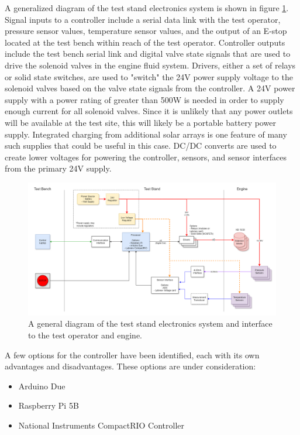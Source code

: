         A generalized diagram of the test stand electronics system is shown in figure \ref{fig:gen_elec}. Signal inputs to a controller include a serial data link with the test operator, pressure sensor values, temperature sensor values, and the output of an E-stop located at the test bench within reach of the test operator. Controller outputs include the test bench serial link and digital valve state signals that are used to drive the solenoid valves in the engine fluid system. Drivers, either a set of relays or solid state switches, are used to "switch" the 24V power supply voltage to the solenoid valves based on the valve state signals from the controller. A 24V power supply with a power rating of greater than 500W is needed in order to supply enough current for all solenoid valves. Since it is unlikely that any power outlets will be available at the test site, this will likely be a portable battery power supply. Integrated charging from additional solar arrays is one feature of many such supplies that could be useful in this case. DC/DC converts are used to create lower voltages for powering the controller, sensors, and sensor interfaces from the primary 24V supply.

        \begin{figure}[H]
            \centering
            \includegraphics[width=1\textwidth]{figures/Electronics_Diagram_General.png}
            \caption{A general diagram of the test stand electronics system and interface to the test operator and engine.}
            \label{fig:gen_elec}
        \end{figure}

        A few options for the controller have been identified, each with its own advantages and disadvantages. These options are under consideration:
        \begin{itemize}
            \item Arduino Due
            \item Raspberry Pi 5B
            \item National Instruments CompactRIO Controller
        \end{itemize}


